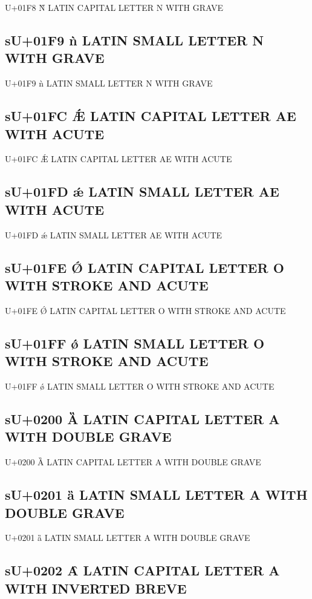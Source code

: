 U+01F8 Ǹ LATIN CAPITAL LETTER N WITH GRAVE

\subsection{sU+01F9 ǹ LATIN SMALL LETTER N WITH GRAVE}

U+01F9 ǹ LATIN SMALL LETTER N WITH GRAVE

\subsection{sU+01FC Ǽ LATIN CAPITAL LETTER AE WITH ACUTE}

U+01FC Ǽ LATIN CAPITAL LETTER AE WITH ACUTE

\subsection{sU+01FD ǽ LATIN SMALL LETTER AE WITH ACUTE}

U+01FD ǽ LATIN SMALL LETTER AE WITH ACUTE

\subsection{sU+01FE Ǿ LATIN CAPITAL LETTER O WITH STROKE AND ACUTE}

U+01FE Ǿ LATIN CAPITAL LETTER O WITH STROKE AND ACUTE

\subsection{sU+01FF ǿ LATIN SMALL LETTER O WITH STROKE AND ACUTE}

U+01FF ǿ LATIN SMALL LETTER O WITH STROKE AND ACUTE

\subsection{sU+0200 Ȁ LATIN CAPITAL LETTER A WITH DOUBLE GRAVE}

U+0200 Ȁ LATIN CAPITAL LETTER A WITH DOUBLE GRAVE

\subsection{sU+0201 ȁ LATIN SMALL LETTER A WITH DOUBLE GRAVE}

U+0201 ȁ LATIN SMALL LETTER A WITH DOUBLE GRAVE

\subsection{sU+0202 Ȃ LATIN CAPITAL LETTER A WITH INVERTED BREVE}

